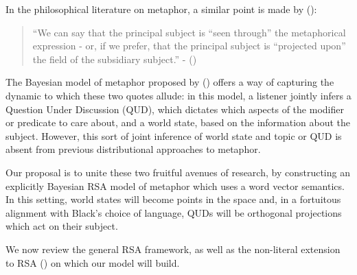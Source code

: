\documentclass[10pt,letterpaper,twocolumn]{article}
\begin{document}
In the philosophical literature on metaphor, a similar point is made by (\cite{black}):
		\begin{quote}
``We can say that the principal subject is  ``seen through'' the metaphorical expression - or, if we prefer, that the principal subject is ``projected upon'' the field of the subsidiary subject.'' - (\cite{black})
\end{quote}

The Bayesian model of metaphor proposed by (\cite{kao}) offers a way of capturing the dynamic to which these two quotes allude: in this model, a listener jointly infers a Question Under Discussion (QUD), which dictates which aspects of the modifier or predicate to care about, and a world state, based on the information about the subject. However, this sort of joint inference of world state and topic or QUD is absent from previous distributional approaches to metaphor.

Our proposal is to unite these two fruitful avenues of research, by constructing an explicitly Bayesian RSA model of metaphor which uses a word vector semantics. In this setting, world states will become points in the space and, in a fortuitous alignment with Black's choice of language, QUDs will be orthogonal projections which act on their subject.

We now review the general RSA framework, as well as the non-literal extension to RSA (\cite{kao}) on which our model will build.






\end{document}
